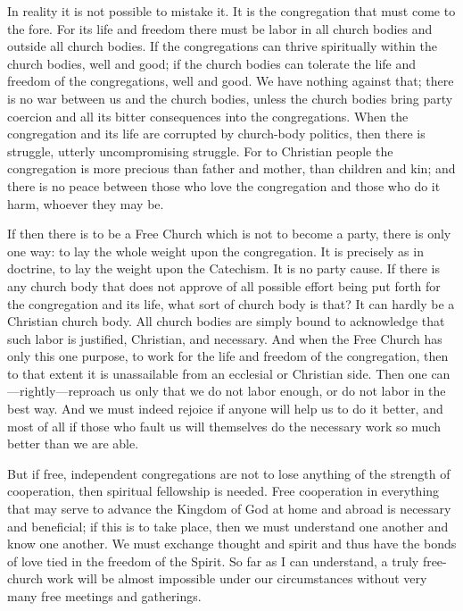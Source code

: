 In reality it is not possible to mistake it. It is the congregation that must come to the fore. For its life and freedom there must be labor in all church bodies and outside all church bodies. If the congregations can thrive spiritually within the church bodies, well and good; if the church bodies can tolerate the life and freedom of the congregations, well and good. We have nothing against that; there is no war between us and the church bodies, unless the church bodies bring party coercion and all its bitter consequences into the congregations. When the congregation and its life are corrupted by church-body politics, then there is struggle, utterly uncompromising struggle. For to Christian people the congregation is more precious than father and mother, than children and kin; and there is no peace between those who love the congregation and those who do it harm, whoever they may be.

If then there is to be a Free Church which is not to become a party, there is only one way: to lay the whole weight upon the congregation. It is precisely as in doctrine, to lay the weight upon the Catechism. It is no party cause. If there is any church body that does not approve of all possible effort being put forth for the congregation and its life, what sort of church body is that? It can hardly be a Christian church body. All church bodies are simply bound to acknowledge that such labor is justified, Christian, and necessary. And when the Free Church has only this one purpose, to work for the life and freedom of the congregation, then to that extent it is unassailable from an ecclesial or Christian side. Then one can—rightly—reproach us only that we do not labor enough, or do not labor in the best way. And we must indeed rejoice if anyone will help us to do it better, and most of all if those who fault us will themselves do the necessary work so much better than we are able.

But if free, independent congregations are not to lose anything of the strength of cooperation, then spiritual fellowship is needed. Free cooperation in everything that may serve to advance the Kingdom of God at home and abroad is necessary and beneficial; if this is to take place, then we must understand one another and know one another. We must exchange thought and spirit and thus have the bonds of love tied in the freedom of the Spirit. So far as I can understand, a truly free-church work will be almost impossible under our circumstances without very many free meetings and gatherings.

